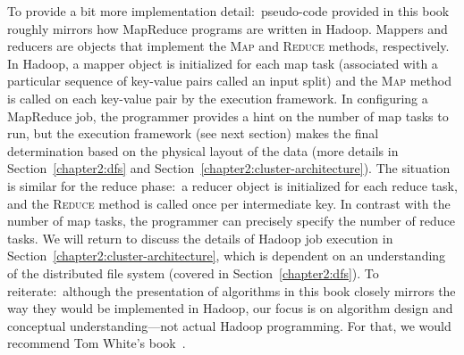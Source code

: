 To provide a bit more implementation detail:\ pseudo-code provided in
this book roughly mirrors how MapReduce programs are written in
Hadoop.  Mappers and reducers are objects that implement
the \textsc{Map} and \textsc{Reduce} methods, respectively.  In
Hadoop, a mapper object is initialized for each map task (associated
with a particular sequence of key-value pairs called an input split)
and the \textsc{Map} method is called on each key-value pair by the
execution framework.  In configuring a MapReduce job, the programmer
provides a hint on the number of map tasks to run, but the execution
framework (see next section) makes the final determination based on
the physical layout of the data (more details in
Section~\ref{chapter2:dfs} and
Section~\ref{chapter2:cluster-architecture}).  The situation is
similar for the reduce phase:\ a reducer object is initialized for
each reduce task, and the \textsc{Reduce} method is called once per
intermediate key.  In contrast with the number of map tasks, the
programmer can precisely specify the number of reduce tasks.  We will
return to discuss the details of Hadoop job execution in
Section~\ref{chapter2:cluster-architecture}, which is dependent on an
understanding of the distributed file system (covered in
Section~\ref{chapter2:dfs}).  To reiterate:\ although the presentation
of algorithms in this book closely mirrors the way they would be
implemented in Hadoop, our focus is on algorithm design and conceptual
understanding---not actual Hadoop programming.  For that, we would
recommend Tom White's book~\cite{White_2009}.

